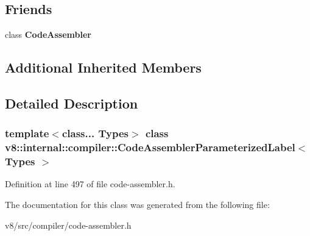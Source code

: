 \subsection*{Friends}
\begin{DoxyCompactItemize}
\item 
\mbox{\label{classv8_1_1internal_1_1compiler_1_1CodeAssemblerParameterizedLabel_a3b23f262333c9e8e9f3891ea68a40d19}} 
class {\bfseries Code\+Assembler}
\end{DoxyCompactItemize}
\subsection*{Additional Inherited Members}


\subsection{Detailed Description}
\subsubsection*{template$<$class... Types$>$\newline
class v8\+::internal\+::compiler\+::\+Code\+Assembler\+Parameterized\+Label$<$ Types $>$}



Definition at line 497 of file code-\/assembler.\+h.



The documentation for this class was generated from the following file\+:\begin{DoxyCompactItemize}
\item 
v8/src/compiler/code-\/assembler.\+h\end{DoxyCompactItemize}
